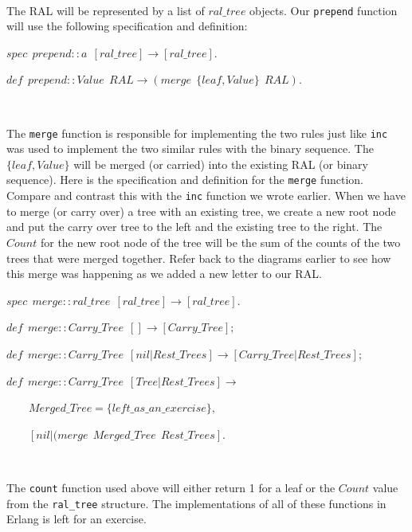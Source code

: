 \documentclass[
]{book}
\begin{document}
\(\nonumber\)

The RAL will be represented by a list of \(ral\_tree\) objects. Our \texttt{prepend} function will use the following specification and definition:

\begin{formulabox}
\(spec ~ ~ prepend :: a ~ ~ [ral\_tree] \rightarrow [ral\_tree].\)

\(de\mathit{f} ~ ~ prepend :: Value ~ ~ RAL \rightarrow (merge ~ ~ \lbrace lea\mathit{f}, Value \rbrace ~ ~ RAL).\)

\end{formulabox}

\(\nonumber\)

The \texttt{merge} function is responsible for implementing the two rules just like \texttt{inc} was used to implement the two similar rules with the binary sequence. The \(\lbrace leaf, Value \rbrace\) will be merged (or carried) into the existing RAL (or binary sequence). Here is the specification and definition for the \texttt{merge} function. Compare and contrast this with the \texttt{inc} function we wrote earlier. When we have to merge (or carry over) a tree with an existing tree, we create a new root node and put the carry over tree to the left and the existing tree to the right. The \(Count\) for the new root node of the tree will be the sum of the counts of the two trees that were merged together. Refer back to the diagrams earlier to see how this merge was happening as we added a new letter to our RAL.

\begin{formulabox}
\(spec ~ ~ merge :: ral\_tree ~ ~ [ral\_tree] \rightarrow [ral\_tree].\)

\(de\mathit{f} ~ ~ merge :: Carry\_Tree ~ ~ [] \rightarrow [Carry\_Tree];\)

\(de\mathit{f} ~ ~ merge :: Carry\_Tree ~ ~ [nil|Rest\_Trees] \rightarrow [Carry\_Tree|Rest\_Trees];\)

\(de\mathit{f} ~ ~ merge :: Carry\_Tree ~ ~ [Tree|Rest\_Trees] \rightarrow\)

\(\quad \quad Merged\_Tree = \lbrace left\_as\_an\_exercise \rbrace,\)

\(\quad \quad [nil|(merge ~ ~ Merged\_Tree ~ ~ Rest\_Trees].\)

\end{formulabox}

\(\nonumber\)

The \texttt{count} function used above will either return 1 for a leaf or the \(Count\) value from the \texttt{ral\_tree} structure. The implementations of all of these functions in Erlang is left for an exercise.
\end{document}
